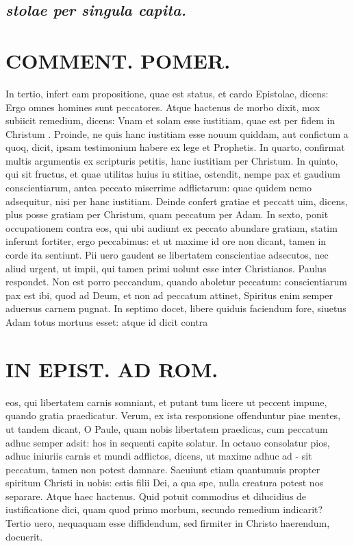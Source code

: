 \documentclass{article}
\begin{document}
\begin{pages}
\subsection*{\textit{stolae per singula capita.  }}
\section*{COMMENT. POMER.  }
\marginpar{[ p.III ]}
\marginpar{[ p.IIII ]}
\marginpar{[ p.V ]}
\marginpar{[ p.VI ]}
\marginpar{[ p.VII ]}\pstart In tertio, infert eam propositione, quae est status, et cardo Epistolae, dicens: Ergo omnes homines sunt peccatores. Atque hactenus de morbo dixit, mox subiicit remedium, dicens: Vnam et solam esse iustitiam, quae est per fidem in Christum . Proinde, ne quis hanc iustitiam esse nouum quiddam, aut confictum a quoq, dicit, ipsam testimonium habere ex lege et Prophetis.   \pend\pstart In quarto, confirmat multis argumentis ex scripturis petitis, hanc iustitiam per Christum.  In quinto, qui sit fructus, et quae utilitas huius iu stitiae, ostendit, nempe pax et gaudium conscientiarum, antea peccato miserrime adflictarum: quae quidem nemo adsequitur, nisi per hanc iustitiam. Deinde confert gratiae et peccatt uim, dicens, plus posse gratiam per Christum, quam peccatum per Adam.  In sexto, ponit occupationem contra eos, qui ubi audiunt ex peccato abundare gratiam, statim inferunt fortiter, ergo peccabimus: et ut maxime id ore non dicant, tamen in corde ita sentiunt. Pii uero gaudent se libertatem conscientiae adsecutos, nec aliud urgent, ut impii, qui tamen primi uolunt esse inter Christianos. Paulus respondet. Non est porro peccandum, quando aboletur peccatum: conscientiarum pax est ibi, quod ad Deum, et non ad peccatum attinet, Spiritus enim semper aduersus carnem pugnat.   \pend\pstart In septimo docet, libere quiduis faciendum fore, siuetus Adam totus mortuus esset: atque id dicit contra  \pend
\section*{IN EPIST. AD ROM.  }
\marginpar{[ p.8 ]}
\marginpar{[ p.VIII ]}\pstart eos, qui libertatem carnis somniant, et putant tum licere ut peccent impune, quando gratia praedicatur.  Verum, ex ista responsione offenduntur piae mentes, ut tandem dicant, O Paule, quam nobis libertatem praedicas, cum peccatum adhuc semper adsit: hos in sequenti capite solatur.   \pend\pstart In octauo consolatur pios, adhuc iniuriis carnis et mundi adflictos, dicens, ut maxime adhuc ad - sit peccatum, tamen non potest damnare. Saeuiunt etiam quantumuis propter spiritum Christi in uobis: estis filii Dei, a qua spe, nulla creatura potest nos separare. Atque haec hactenus. Quid potuit commodius et dilucidius de iustificatione dici, quam quod primo morbum, secundo remedium indicarit? Tertio uero, nequaquam esse diffidendum, sed firmiter in Christo haerendum, docuerit.   \pend
{}
{}

\end{pages}
\end{document}
